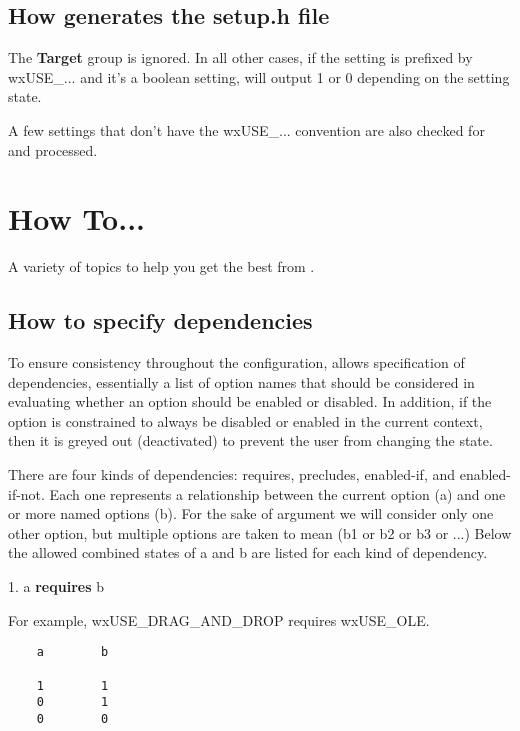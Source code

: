 \section{How \ctshortname generates the setup.h file}

The {\bf Target} group is ignored. In all other
cases, if the setting is prefixed by wxUSE_...
and it's a boolean setting, \ctshortname will
output 1 or 0 depending on the setting state.

A few settings that don't have the wxUSE_...
convention are also checked for and processed.


\chapter{How To...}\label{howto}%
%
\setfooter{\thepage}{}{}{}{}{\thepage}%

A variety of topics to help you get the best from \ctshortname.

\section{How to specify dependencies}\label{dependencies}

To ensure consistency throughout the configuration,
\ctshortname allows specification of dependencies, essentially
a list of option names that should be considered in evaluating
whether an option should be enabled or disabled. In addition,
if the option is constrained to always be disabled
or enabled in the current context, then it is greyed out
(deactivated) to prevent the user from changing the state.

There are four kinds of dependencies: requires, precludes,
enabled-if, and enabled-if-not. Each one represents a
relationship between the current option (a) and one
or more named options (b). For the sake of argument
we will consider only one other option, but multiple
options are taken to mean (b1 or b2 or b3 or ...)
Below the allowed combined states of a and b are
listed for each kind of dependency.

1. a {\bf requires} b

For example, wxUSE_DRAG_AND_DROP requires wxUSE_OLE.

\begin{verbatim}
    a        b

    1        1
    0        1
    0        0
\end{verbatim}

